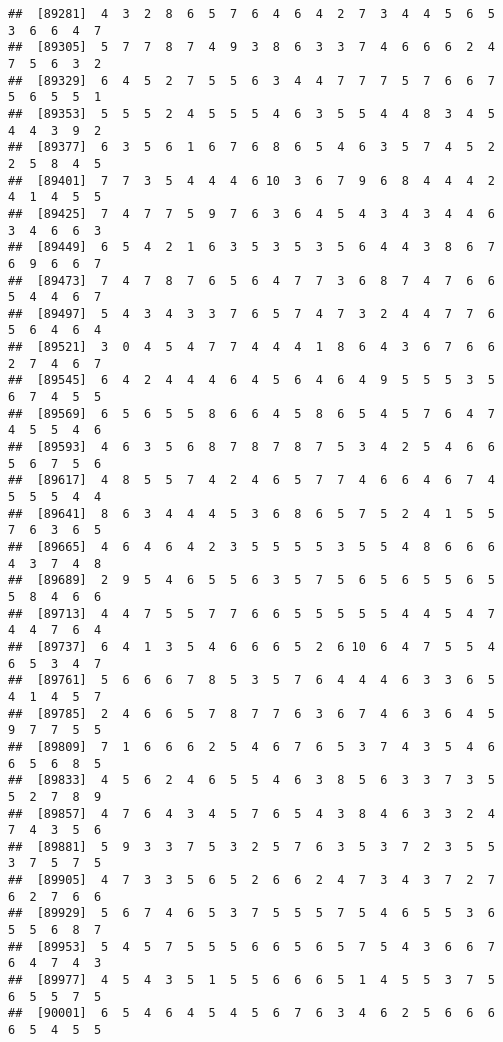 \documentclass[
]{book}
\begin{document}
\begin{verbatim}
##  [89281]  4  3  2  8  6  5  7  6  4  6  4  2  7  3  4  4  5  6  5  3  6  6  4  7
##  [89305]  5  7  7  8  7  4  9  3  8  6  3  3  7  4  6  6  6  2  4  7  5  6  3  2
##  [89329]  6  4  5  2  7  5  5  6  3  4  4  7  7  7  5  7  6  6  7  5  6  5  5  1
##  [89353]  5  5  5  2  4  5  5  5  4  6  3  5  5  4  4  8  3  4  5  4  4  3  9  2
##  [89377]  6  3  5  6  1  6  7  6  8  6  5  4  6  3  5  7  4  5  2  2  5  8  4  5
##  [89401]  7  7  3  5  4  4  4  6 10  3  6  7  9  6  8  4  4  4  2  4  1  4  5  5
##  [89425]  7  4  7  7  5  9  7  6  3  6  4  5  4  3  4  3  4  4  6  3  4  6  6  3
##  [89449]  6  5  4  2  1  6  3  5  3  5  3  5  6  4  4  3  8  6  7  6  9  6  6  7
##  [89473]  7  4  7  8  7  6  5  6  4  7  7  3  6  8  7  4  7  6  6  5  4  4  6  7
##  [89497]  5  4  3  4  3  3  7  6  5  7  4  7  3  2  4  4  7  7  6  5  6  4  6  4
##  [89521]  3  0  4  5  4  7  7  4  4  4  1  8  6  4  3  6  7  6  6  2  7  4  6  7
##  [89545]  6  4  2  4  4  4  6  4  5  6  4  6  4  9  5  5  5  3  5  6  7  4  5  5
##  [89569]  6  5  6  5  5  8  6  6  4  5  8  6  5  4  5  7  6  4  7  4  5  5  4  6
##  [89593]  4  6  3  5  6  8  7  8  7  8  7  5  3  4  2  5  4  6  6  5  6  7  5  6
##  [89617]  4  8  5  5  7  4  2  4  6  5  7  7  4  6  6  4  6  7  4  5  5  5  4  4
##  [89641]  8  6  3  4  4  4  5  3  6  8  6  5  7  5  2  4  1  5  5  7  6  3  6  5
##  [89665]  4  6  4  6  4  2  3  5  5  5  5  3  5  5  4  8  6  6  6  4  3  7  4  8
##  [89689]  2  9  5  4  6  5  5  6  3  5  7  5  6  5  6  5  5  6  5  5  8  4  6  6
##  [89713]  4  4  7  5  5  7  7  6  6  5  5  5  5  5  4  4  5  4  7  4  4  7  6  4
##  [89737]  6  4  1  3  5  4  6  6  6  5  2  6 10  6  4  7  5  5  4  6  5  3  4  7
##  [89761]  5  6  6  6  7  8  5  3  5  7  6  4  4  4  6  3  3  6  5  4  1  4  5  7
##  [89785]  2  4  6  6  5  7  8  7  7  6  3  6  7  4  6  3  6  4  5  9  7  7  5  5
##  [89809]  7  1  6  6  6  2  5  4  6  7  6  5  3  7  4  3  5  4  6  6  5  6  8  5
##  [89833]  4  5  6  2  4  6  5  5  4  6  3  8  5  6  3  3  7  3  5  5  2  7  8  9
##  [89857]  4  7  6  4  3  4  5  7  6  5  4  3  8  4  6  3  3  2  4  7  4  3  5  6
##  [89881]  5  9  3  3  7  5  3  2  5  7  6  3  5  3  7  2  3  5  5  3  7  5  7  5
##  [89905]  4  7  3  3  5  6  5  2  6  6  2  4  7  3  4  3  7  2  7  6  2  7  6  6
##  [89929]  5  6  7  4  6  5  3  7  5  5  5  7  5  4  6  5  5  3  6  5  5  6  8  7
##  [89953]  5  4  5  7  5  5  5  6  6  5  6  5  7  5  4  3  6  6  7  6  4  7  4  3
##  [89977]  4  5  4  3  5  1  5  5  6  6  6  5  1  4  5  5  3  7  5  6  5  5  7  5
##  [90001]  6  5  4  6  4  5  4  5  6  7  6  3  4  6  2  5  6  6  6  6  5  4  5  5

\end{verbatim}
\end{document}
